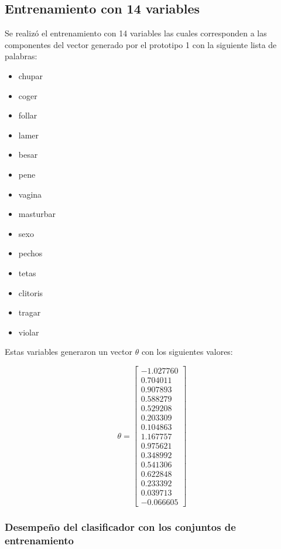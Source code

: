 \subsection{Entrenamiento con 14 variables}
Se realiz\'o el entrenamiento con 14 variables las cuales corresponden a las componentes del vector generado por el prototipo 1 con la siguiente lista de palabras:
\begin{itemize}
\item chupar 
\item coger
\item follar
\item lamer
\item besar
\item pene 
\item vagina
\item masturbar
\item sexo
\item pechos
\item tetas
\item clitoris
\item tragar
\item violar
\end{itemize}

Estas variables generaron un vector $\theta$ con los siguientes valores:

\begin{equation}
\theta = 
\begin{bmatrix}

-1.027760 \\
 0.704011 \\
 0.907893 \\
 0.588279 \\
 0.529208 \\
 0.203309 \\
 0.104863 \\
 1.167757 \\
 0.975621 \\
 0.348992 \\
 0.541306 \\
 0.622848 \\
 0.233392 \\
 0.039713 \\
 -0.066605
 
\end{bmatrix}
\end{equation}

\subsubsection{Desempe\~no del clasificador con los conjuntos de entrenamiento}

